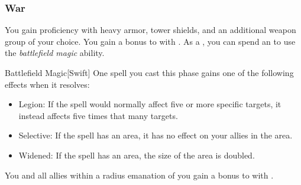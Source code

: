         \subsubsection{War}
             You gain proficiency with heavy armor, tower shields, and an additional weapon group of your choice.
             You gain a  bonus to  with .
             As a , you can spend an  to use the \textit{battlefield magic} ability.
            \begin{ability}{Battlefield Magic}[Swift]
                One spell you cast this phase gains one of the following effects when it resolves:
                \begin{itemize}
                    \item Legion: If the spell would normally affect five or more specific targets, it instead affects five times that many targets.
                    \item Selective: If the spell has an area, it has no effect on your allies in the area.
                    \item Widened: If the spell has an area, the size of the area is doubled.
                \end{itemize}
            \end{ability}
             You and all allies within a \arealarge radius emanation of you gain a  bonus to  with .


